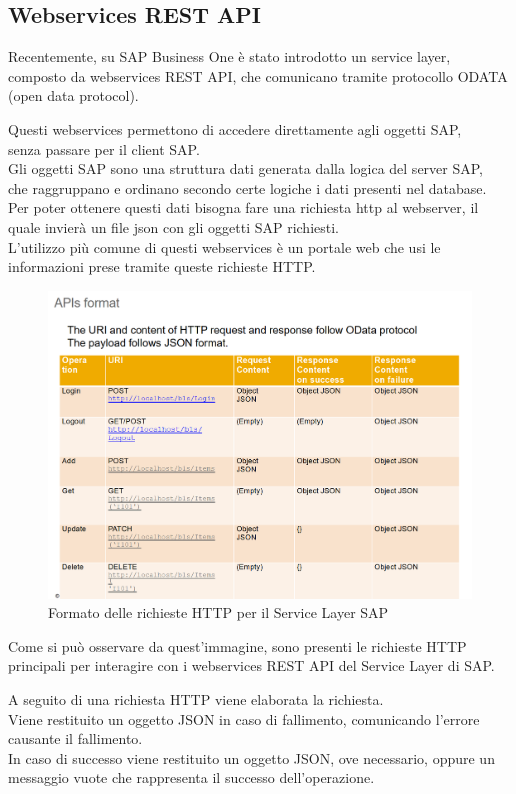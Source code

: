 \subsection{Webservices REST API}
\begin{flushleft}
	\item Recentemente, su SAP Business One è stato introdotto un service layer, composto da webservices REST API, che comunicano tramite protocollo ODATA (open data protocol).
	\item Questi webservices permettono di accedere direttamente agli oggetti SAP,\\senza passare per il client SAP.\\Gli oggetti SAP sono una struttura dati generata dalla logica del server SAP, \\che raggruppano e ordinano secondo certe logiche i dati presenti nel database.
	\\ Per poter ottenere questi dati bisogna fare una richiesta http al webserver, il quale invierà un file json con gli oggetti SAP richiesti.
	\\L'utilizzo più comune di questi webservices è un portale web che usi le informazioni prese tramite queste richieste HTTP. 
\end{flushleft}
\begin{figure}[!h] 
	\centering 
	\includegraphics[scale = 0.37]{immagini/api_Format.png} 
	\caption {Formato delle richieste HTTP per il Service Layer SAP}
\end{figure}
\begin{flushleft}
	\item Come si può osservare da quest'immagine, sono presenti le richieste HTTP principali per interagire con i webservices REST API del Service Layer di SAP.
	\item A seguito di una richiesta HTTP viene elaborata la richiesta.\\Viene restituito un oggetto JSON in caso di fallimento, comunicando l'errore causante il fallimento.\\In caso di successo viene restituito un oggetto JSON, ove necessario, oppure un messaggio vuote che rappresenta il successo dell'operazione.
\end{flushleft}
